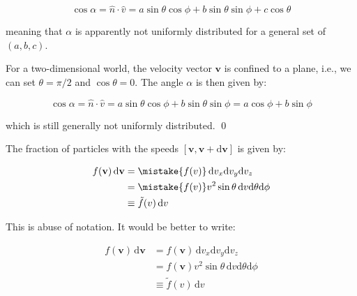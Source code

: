 \documentclass[12pt]{article}
\begin{document}
\begin{equation}
    \cos{\alpha} = \hat{n} \cdot \hat{v} = a \sin{\theta} \cos{\phi} + b \sin{\theta} \sin{\phi} + c \cos{\theta}
\end{equation}

meaning that $\alpha$ is apparently not uniformly distributed for a general set of $(a, b, c)$.

For a two-dimensional world, the velocity vector $\mathbf{v}$ is confined to a plane, i.e., we can set $\theta = \pi/2$ and $\cos{\theta} = 0$. The angle $\alpha$ is then given by:

\begin{equation}
    \cos{\alpha} = \hat{n} \cdot \hat{v} = a \sin{\theta} \cos{\phi} + b \sin{\theta} \sin{\phi} = a \cos{\phi} + b \sin{\phi}
\end{equation}

which is still generally not uniformly distributed.
\qed



The fraction of particles with the speeds $[\mathbf{v}, \mathbf{v} + \mathrm{d}\mathbf{v}]$ is given by:

\begin{equation}
    \begin{split}
        f(\mathbf{v}) \, \mathrm{d}\mathbf{v} &= \mistake{f(v)} \, \mathrm{d}v_{x} \mathrm{d}v_{y} \mathrm{d}v_{z} \\
        &= \mistake{f(v)} v^{2} \sin{\theta} \, \mathrm{d}v \mathrm{d}\theta \mathrm{d}\phi \\
        &\equiv \tilde{f}(v) \, \mathrm{d}v
    \end{split}
\end{equation}

\begin{correction}
    This is abuse of notation. It would be better to write:

    \begin{equation}
        \begin{split}
            f(\mathbf{v}) \, \mathrm{d}\mathbf{v} &= f(\mathbf{v}) \, \mathrm{d}v_{x} \mathrm{d}v_{y} \mathrm{d}v_{z} \\
            &= f(\mathbf{v}) v^{2} \sin{\theta} \, \mathrm{d}v \mathrm{d}\theta \mathrm{d}\phi \\
            &\equiv \tilde{f}(v) \, \mathrm{d}v
        \end{split}
    \end{equation}
\end{correction}
\end{document}
